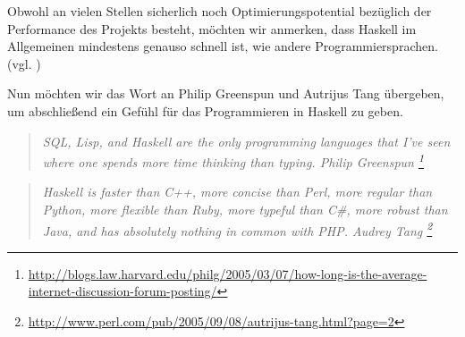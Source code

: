Obwohl an vielen Stellen sicherlich noch Optimierungspotential bezüglich der
Performance des Projekts besteht, möchten wir anmerken, dass Haskell im
Allgemeinen mindestens genauso schnell ist, wie andere Programmiersprachen.
(vgl. \autocite{haskellwiki:performance}) 

Nun möchten wir das Wort an 
Philip Greenspun und Autrijus Tang übergeben, um abschließend ein Gefühl für das
Programmieren in Haskell zu geben.

\begin{quote}
  \itshape SQL, Lisp, and Haskell are the only programming languages that 
  I've seen where one spends more time thinking than typing.
  \hfill\normalfont\sffamily\small Philip Greenspun%
  \footnote{%
  \url{http://blogs.law.harvard.edu/philg/2005/03/07/how-long-is-the-average-internet-discussion-forum-posting/}}
\end{quote}

\begin{quote}
  \itshape 
  Haskell is faster than C++, more concise than Perl, more regular than Python,
  more flexible than Ruby, more typeful than C\#, more robust than Java, and 
  has absolutely nothing in common with PHP.
  \hfill\normalfont\sffamily\small Audrey Tang%
  \footnote{\url{http://www.perl.com/pub/2005/09/08/autrijus-tang.html?page=2}}
\end{quote}
